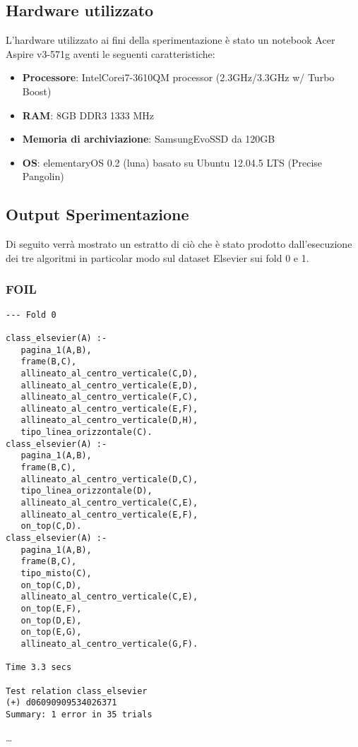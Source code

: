 \subsection{Hardware utilizzato}
\label{hw}
L'hardware utilizzato ai fini della sperimentazione è stato un notebook Acer Aspire v3-571g aventi le seguenti caratteristiche:
\begin{itemize}
	\item \textbf{Processore}: Intel\textregistered Core\texttrademark  i7-3610QM processor (2.3GHz/3.3GHz w/ Turbo Boost)
	\item \textbf{RAM}: 8GB DDR3 1333 MHz
	\item \textbf{Memoria di archiviazione}: Samsung\textregistered Evo\texttrademark SSD da 120GB 
	\item \textbf{OS}: elementaryOS 0.2 (luna) basato su Ubuntu 12.04.5 LTS (Precise Pangolin)
\end{itemize}

\subsection{Output Sperimentazione}
Di seguito verrà mostrato un estratto di ciò che è stato prodotto dall'esecuzione dei tre algoritmi in particolar modo sul dataset Elsevier sui fold 0 e 1.
\subsubsection{FOIL}
\begin{verbatim}
--- Fold 0

class_elsevier(A) :- 
   pagina_1(A,B), 
   frame(B,C), 
   allineato_al_centro_verticale(C,D),
   allineato_al_centro_verticale(E,D), 
   allineato_al_centro_verticale(F,C), 
   allineato_al_centro_verticale(E,F), 
   allineato_al_centro_verticale(D,H), 
   tipo_linea_orizzontale(C).
class_elsevier(A) :- 
   pagina_1(A,B), 
   frame(B,C), 
   allineato_al_centro_verticale(D,C), 
   tipo_linea_orizzontale(D), 
   allineato_al_centro_verticale(C,E), 
   allineato_al_centro_verticale(E,F), 
   on_top(C,D).
class_elsevier(A) :- 
   pagina_1(A,B), 
   frame(B,C), 
   tipo_misto(C), 
   on_top(C,D), 
   allineato_al_centro_verticale(C,E), 
   on_top(E,F), 
   on_top(D,E), 
   on_top(E,G), 
   allineato_al_centro_verticale(G,F).

Time 3.3 secs

Test relation class_elsevier
(+)	d06090909534026371
Summary: 1 error in 35 trials
\end{verbatim}
\dots
